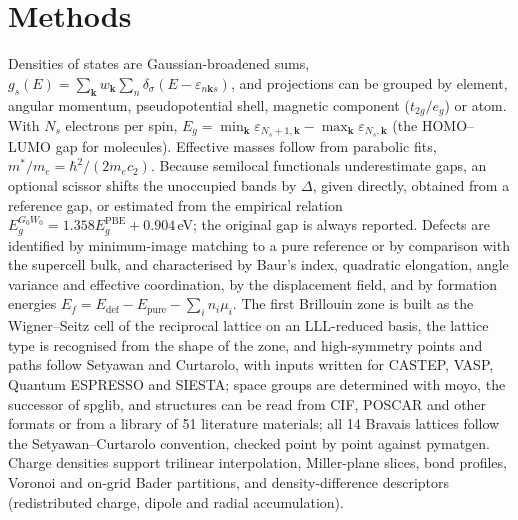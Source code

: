\documentclass[journal=jcisd8,manuscript=note]{achemso}
\begin{document}
\section{Methods}
Densities of states are Gaussian-broadened sums, $g_s(E)=\sum_{\bm k}w_{\bm k}\sum_n\delta_\sigma(E-\varepsilon_{n\bm k s})$, and projections can be grouped by element, angular momentum, pseudopotential shell, magnetic component ($t_{2g}/e_g$) or atom. With $N_s$ electrons per spin, $E_g=\min_{\bm k}\varepsilon_{N_s+1,\bm k}-\max_{\bm k}\varepsilon_{N_s,\bm k}$ (the HOMO--LUMO gap for molecules). Effective masses follow from parabolic fits, $m^*/m_e=\hbar^2/(2m_e c_2)$. Because semilocal functionals underestimate gaps,\cite{perdew1983,sham1983} an optional scissor\cite{levine1989} shifts the unoccupied bands by $\Delta$, given directly, obtained from a reference gap, or estimated from the empirical relation $E_g^{G_0W_0}=1.358E_g^\mathrm{PBE}+0.904$\,eV;\cite{morales2017} the original gap is always reported. Defects are identified by minimum-image matching to a pure reference or by comparison with the supercell bulk, and characterised by Baur's index, quadratic elongation, angle variance\cite{robinson1971,baur1974} and effective coordination,\cite{hoppe1979} by the displacement field, and by formation energies $E_f=E_\mathrm{def}-E_\mathrm{pure}-\sum_in_i\mu_i$.\cite{freysoldt2014} The first Brillouin zone is built as the Wigner--Seitz cell of the reciprocal lattice on an LLL-reduced basis,\cite{lenstra1982} the lattice type is recognised from the shape of the zone, and high-symmetry points and paths follow Setyawan and Curtarolo,\cite{setyawan2010} with inputs written for CASTEP, VASP, Quantum ESPRESSO and SIESTA; space groups are determined with moyo,\cite{moyo} the successor of spglib,\cite{togo2024spglib} and structures can be read from CIF, POSCAR and other formats or from a library of 51 literature materials; all 14 Bravais lattices follow the Setyawan--Curtarolo convention, checked point by point against pymatgen. Charge densities support trilinear interpolation, Miller-plane slices, bond profiles, Voronoi\cite{voronoi1908,gellatly1982} and on-grid Bader\cite{henkelman2006} partitions, and density-difference descriptors (redistributed charge, dipole and radial accumulation).
\end{document}
